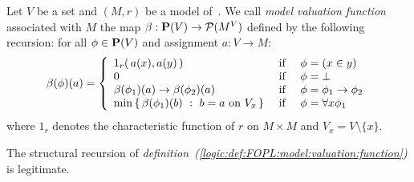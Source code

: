 \begin{defin}\label{logic:def:FOPL:model:valuation:function} Let
$V$ be a set and $(M,r)$ be a model of\, \pv. We call {\em model
valuation function} associated with $M$ the map $\beta:\mbox{${\bf P}(V)$}\to{\cal
P}(M^{V})$ defined by the following recursion: for all $\phi\in\mbox{${\bf P}(V)$}$
and assignment $a:V\to M$:
    \[
                    \beta(\phi)(a)=\left\{
                    \begin{array}{lcl}
                    1_{r}(\,a(x),a(y)\,)&\mbox{\ if\ }&\phi=(x\in y)\\
                    0&\mbox{\ if\ }&\phi=\bot\\
                    \beta(\phi_{1})(a)\to\beta(\phi_{2})(a)&\mbox{\ if\ }&
                    \phi=\phi_{1}\to\phi_{2}\\
                    \min\left\{\,\beta(\phi_{1})(b)\ :\  b=a\mbox{\ on\
                    }V_{x}\,\right\}
                    &\mbox{\ if\ }&\phi=\forall x\phi_{1}\\
                    \end{array}\right.
    \]
where $1_{r}$ denotes the characteristic function of $r$ on $M\times
M$ and $V_{x}=V\setminus\{x\}$.
\end{defin}
\begin{prop}
The structural recursion of {\em
definition~(\ref{logic:def:FOPL:model:valuation:function})} is
legitimate.
\end{prop}
